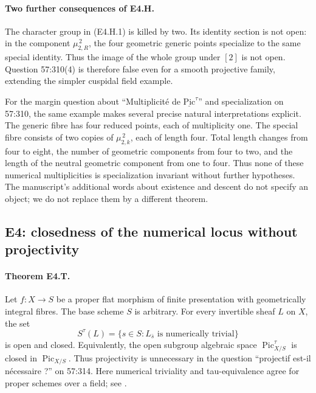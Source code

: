 \paragraph{Two further consequences of E4.H.}
The character group in (E4.H.1) is killed by two. Its identity section is
not open: in the component $\mu_{2,R}^{\,2}$, the four geometric generic
points specialize to the same special identity. Thus the image of the
whole group under $[2]$ is not open. Question 57:310(4) is therefore false
even for a smooth projective family, extending the simpler cuspidal
field example.

For the margin question about ``Multiplicit\'e de
$\underline{\mathrm{Pic}}^\tau$'' and specialization on 57:310, the same
example makes several precise natural interpretations explicit. The
generic fibre has four reduced points, each of multiplicity one. The
special fibre consists of two copies of $\mu_{2,k}^{\,2}$, each of length
four. Total length changes from four to eight, the number of geometric
components from four to two, and the length of the neutral geometric
component from one to four. Thus none of these numerical multiplicities
is specialization invariant without further hypotheses. The manuscript's
additional words about existence and descent do not specify an object;
we do not replace them by a different theorem.

\subsection{E4: closedness of the numerical locus without projectivity}

\paragraph{Theorem E4.T.}
Let $f:X\to S$ be a proper flat morphism of finite presentation with
geometrically integral fibres. The base scheme $S$ is arbitrary. For every
invertible sheaf $L$ on $X$, the set
\[
 S^\tau(L)=\{s\in S:L_{\bar s}\text{ is numerically trivial}\}
                                                        \tag{E4.T.1}
\]
is open and closed. Equivalently, the open subgroup algebraic space
$\operatorname{Pic}^{\tau}_{X/S}$ is closed in
$\operatorname{Pic}_{X/S}$. Thus projectivity is unnecessary in the
question ``projectif est-il n\'ecessaire ?'' on 57:314. Here numerical
triviality and tau-equivalence agree for proper schemes over a field;
see \cite[Remark~6.14, pp.~57--58]{Kleiman2005}.

